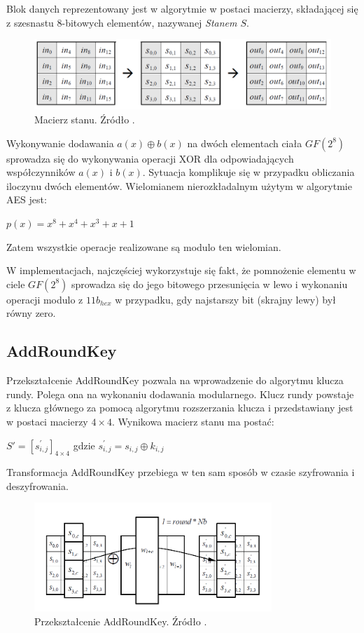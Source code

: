  Blok danych reprezentowany jest w algorytmie w postaci macierzy, składającej się z szesnastu 8-bitowych elementów, nazywanej \textit{Stanem $S$}. 

\begin{figure}[H]
    \centering
    \includegraphics[width=\textwidth]{rysunki/AES_opis/state.PNG}
    \caption{Macierz stanu. Źródło \cite{fips_197}.}
    \label{fig:state_macierz}
\end{figure}

Wykonywanie dodawania $a(x) \oplus b(x)$ na dwóch elementach ciała $GF(2^8)$ sprowadza się do wykonywania operacji XOR dla odpowiadających współczynników $a(x)$ i $b(x)$. Sytuacja komplikuje się w przypadku obliczania iloczynu dwóch elementów. Wielomianem nierozkładalnym użytym w algorytmie AES jest:
\begin{center}
$p(x)=x^8+x^4+x^3+x+1$
\end{center}
Zatem wszystkie operacje realizowane są modulo ten wielomian.

W implementacjach, najczęściej wykorzystuje się fakt, że pomnożenie elementu w ciele $GF(2^8)$ sprowadza się do jego bitowego przesunięcia w lewo i wykonaniu operacji modulo z $11b_{hex}$ w przypadku, gdy najstarszy bit (skrajny lewy) był równy zero.

\subsection{AddRoundKey}
Przekształcenie AddRoundKey pozwala na wprowadzenie do algorytmu klucza rundy. Polega ona na wykonaniu dodawania modularnego. Klucz rundy powstaje z klucza głównego za pomocą algorytmu rozszerzania klucza i przedstawiany jest w postaci macierzy $4 \times 4$. Wynikowa macierz stanu ma postać:
\begin{center}
$S'=[s^{'}_{i,j}]_{4 \times 4}$ gdzie $s^{'}_{i,j}=s_{i,j} \oplus k_{i,j}$
\end{center}
Transformacja AddRoundKey przebiega w ten sam sposób w czasie szyfrowania i deszyfrowania.

\begin{figure}[H]
    \centering
    \includegraphics[width=0.8\textwidth]{rysunki/AES_opis/addroundkey.PNG}
    \caption{Przekształcenie AddRoundKey. Źródło \cite{fips_197}.}
    \label{fig:addroundkey}
\end{figure}

